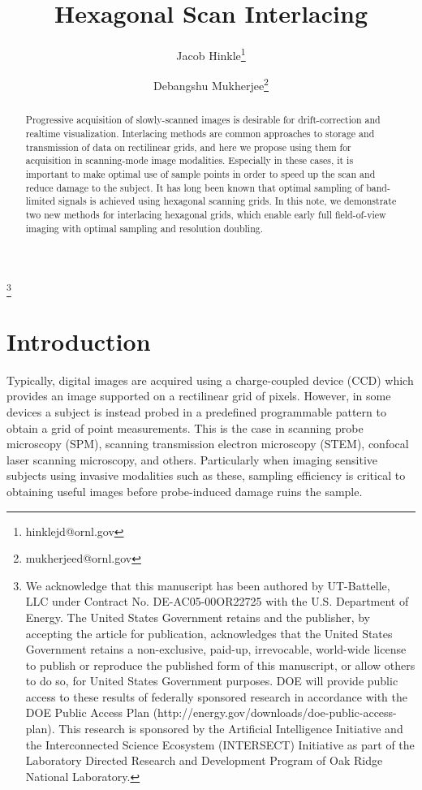 \documentclass{article}
\title{Hexagonal Scan Interlacing}
\author{Jacob Hinkle\thanks{hinklejd@ornl.gov} 
}
\author{Debangshu Mukherjee\thanks{mukherjeed@ornl.gov}
}
\affil{
	Oak Ridge National Laboratory
}
\begin{document}
\maketitle
{
\renewcommand{\thefootnote}{}
\footnote{We acknowledge that this manuscript has been authored by UT-Battelle, LLC under Contract No. DE-AC05-00OR22725 with the U.S. Department of Energy. The United States Government retains and the publisher, by accepting the article for publication, acknowledges that the United States Government retains a non-exclusive, paid-up, irrevocable, world-wide license to publish or reproduce the published form of this manuscript, or allow others to do so, for United States Government purposes. DOE will provide public access to these results of federally sponsored research in accordance with the DOE Public Access Plan (http://energy.gov/downloads/doe-public-access-plan). This research is sponsored by the Artificial Intelligence Initiative and the Interconnected Science Ecosystem (INTERSECT) Initiative as part of the Laboratory Directed Research and Development Program of Oak Ridge National Laboratory.}
\setcounter{footnote}{0}
}
\begin{abstract}
	Progressive acquisition of slowly-scanned images is desirable for drift-correction and realtime visualization.
	Interlacing methods are common approaches to storage and transmission of data on rectilinear grids, and here we propose using them for acquisition in scanning-mode image modalities.
	Especially in these cases, it is important to make optimal use of sample points in order to speed up the scan and reduce damage to the subject.
	It has long been known that optimal sampling of band-limited signals is achieved using hexagonal scanning grids.
	In this note, we demonstrate two new methods for interlacing hexagonal
    grids, which enable early full field-of-view imaging with optimal sampling and resolution doubling.
\end{abstract}

\section{Introduction}
\label{sec:intro}

Typically, digital images are acquired using a charge-coupled device (CCD) which provides an image supported on a rectilinear grid of pixels.
%
However, in some devices a subject is instead probed in a predefined programmable pattern to obtain a grid of point measurements.
%
This is the case in scanning probe microscopy (SPM), scanning transmission electron microscopy (STEM), confocal laser scanning microscopy, and others.
%
Particularly when imaging sensitive subjects using invasive modalities such as
these, sampling efficiency is critical to obtaining useful images before probe-induced damage ruins the sample.
\end{document}
